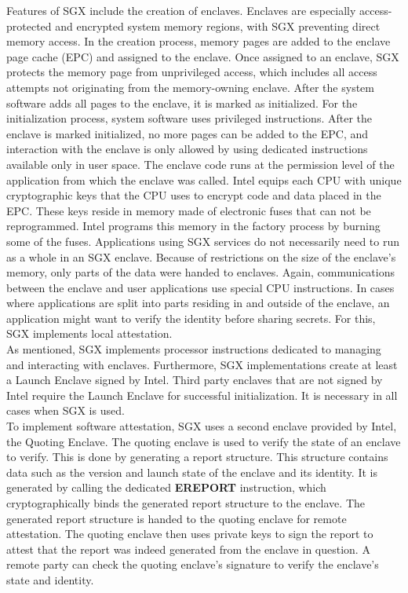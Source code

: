 Features of SGX include the creation of enclaves. Enclaves are especially
access-protected and encrypted system memory regions, with SGX preventing direct
memory access. In the creation process, memory pages are added to the enclave
page cache (EPC) and assigned to the enclave. Once assigned to an enclave, SGX
protects the memory page from unprivileged access, which includes all access
attempts not originating from the memory-owning enclave. After the system
software adds all pages to the enclave, it is marked as initialized. For the
initialization process, system software uses privileged instructions. After the
enclave is marked initialized, no more pages can be added to the EPC, and
interaction with the enclave is only allowed by using dedicated instructions
available only in user space. The enclave code runs at the permission level of
the application from which the enclave was called. Intel equips each CPU with
unique cryptographic keys that the CPU uses to encrypt code and data placed in
the EPC. These keys reside in memory made of electronic fuses that can not be
reprogrammed. Intel programs this memory in the factory process by burning some
of the fuses. Applications using SGX services do not necessarily need to run as
a whole in an SGX enclave. Because of restrictions on the size of the enclave's
memory, only parts of the data were handed to enclaves. Again, communications
between the enclave and user applications use special CPU instructions. In cases
where applications are split into parts residing in and outside of the enclave,
an application might want to verify the identity before sharing secrets. For
this, SGX implements local attestation.\\

As mentioned, SGX implements processor instructions dedicated to managing and
interacting with enclaves. Furthermore, SGX implementations create at least a
Launch Enclave signed by Intel. Third party enclaves that are not signed by
Intel require the Launch Enclave for successful initialization. It is necessary
in all cases when SGX is used.\\

To implement software attestation, SGX uses a second enclave provided by Intel,
the Quoting Enclave. The quoting enclave is used to verify the state
of an enclave to verify. This is done by generating a report structure. This
structure contains data such as the version and launch state of the enclave and
its identity. It is generated by calling the dedicated \textbf{EREPORT}
instruction, which cryptographically binds the generated report structure to the
enclave. The generated report structure is handed to the quoting enclave for
remote attestation. The quoting enclave then uses private keys to sign the
report to attest that the report was indeed generated from the enclave in
question. A remote party can check the quoting enclave's signature to verify the
enclave's state and identity.\\

